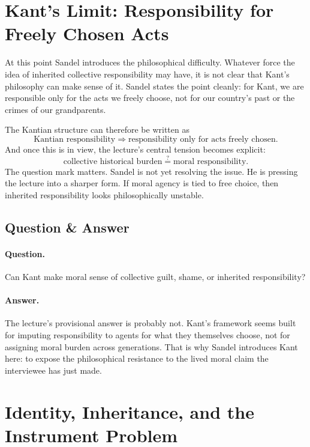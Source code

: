 \section{Kant's Limit: Responsibility for Freely Chosen Acts}

At this point Sandel introduces the philosophical difficulty. Whatever force the idea of inherited collective responsibility may have, it is not clear that Kant's philosophy can make sense of it. Sandel states the point cleanly: for Kant, we are responsible only for the acts we freely choose, not for our country's past or the crimes of our grandparents.

The Kantian structure can therefore be written as
\begin{equation}
\text{Kantian responsibility}
\Longrightarrow
\text{responsibility only for acts freely chosen}.
\end{equation}
And once this is in view, the lecture's central tension becomes explicit:
\begin{equation}
\text{collective historical burden}
\stackrel{?}{=}
\text{moral responsibility}.
\end{equation}
The question mark matters. Sandel is not yet resolving the issue. He is pressing the lecture into a sharper form. If moral agency is tied to free choice, then inherited responsibility looks philosophically unstable.

\subsection{Question \& Answer}

\paragraph{Question.} Can Kant make moral sense of collective guilt, shame, or inherited responsibility?

\paragraph{Answer.} The lecture's provisional answer is probably not. Kant's framework seems built for imputing responsibility to agents for what they themselves choose, not for assigning moral burden across generations. That is why Sandel introduces Kant here: to expose the philosophical resistance to the lived moral claim the interviewee has just made.

\section{Identity, Inheritance, and the Instrument Problem}


